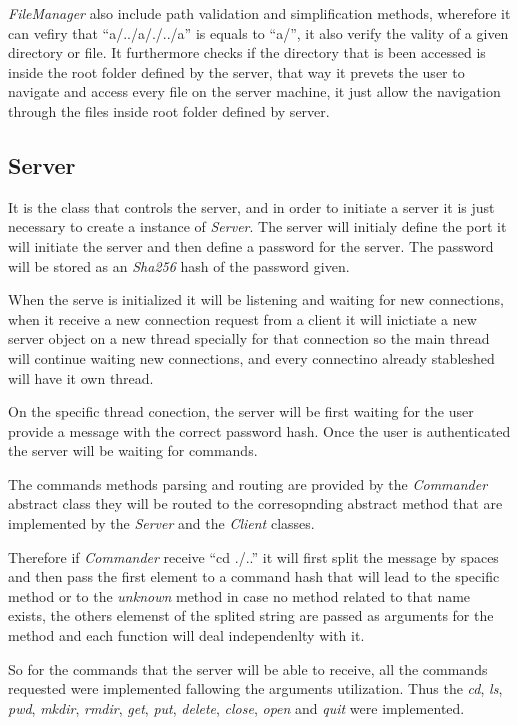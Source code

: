 \documentclass[a4paper, 11pt]{article}
\renewcommand*{\i}{\textit}
\begin{document}
\i{FileManager} also include path validation and simplification methods, wherefore it can vefiry that ``a/../a/./../a'' is equals to ``a/'', it also verify the vality of a given directory or file. It furthermore checks if the directory that is been accessed is inside the root folder defined by the server, that way it prevets the user to navigate and access every file on the server machine, it just allow the navigation through the files inside root folder defined by server.

\subsection{Server}

It is the class that controls the server, and in order to initiate a server it is just necessary to create a instance of \i{Server}. The server will initialy define the port it will initiate the server and then define a password for the server. The password will be stored as an \i{Sha256} hash of the password given.

When the serve is initialized it will be listening and waiting for new connections, when it receive a new connection request from a client it will inictiate a new server object on a new thread specially for that connection so the main thread will continue waiting new connections, and every connectino already stableshed will have it own thread.

On the specific thread conection, the server will be first waiting for the user provide a message with the correct password hash. Once the user is authenticated the server will be waiting for commands.

The commands methods parsing and routing are provided by the \i{Commander} abstract class they will be routed to the corresopnding abstract method that are implemented by the \i{Server} and the \i{Client} classes.

Therefore if \i{Commander} receive ``cd ./..'' it will first split the message by spaces and then pass the first element to a command hash that will lead to the specific method or to the \i{unknown} method in case no method related to that name exists, the others elemenst of the splited string are passed as arguments for the method and each function will deal independenlty with it.

So for the commands that the server will be able to receive, all the commands requested were implemented fallowing the arguments utilization. Thus the \i{cd}, \i{ls}, \i{pwd}, \i{mkdir}, \i{rmdir}, \i{get}, \i{put}, \i{delete}, \i{close}, \i{open} and \i{quit} were implemented.
\end{document}
